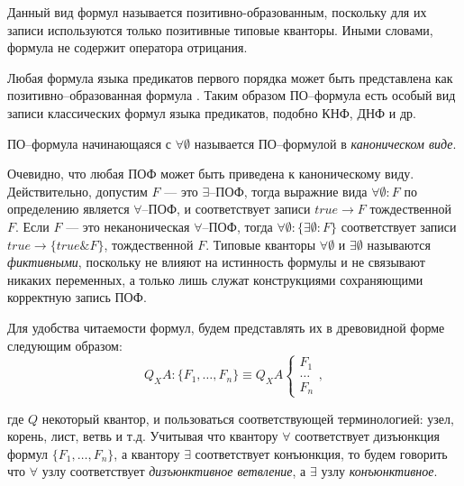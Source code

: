 Данный вид формул называется позитивно-образованным, поскольку для их записи используются только позитивные типовые кванторы. Иными словами, формула не содержит оператора отрицания.

Любая формула языка предикатов первого порядка может быть представлена как позитивно--образованная формула \cite{ICDS2000}. Таким образом ПО--формула есть особый вид записи классических формул языка предикатов, подобно КНФ, ДНФ и др.

ПО--формула начинающаяся с $\forall \emptyset$ называется ПО--формулой в {\em каноническом виде}.


Очевидно, что любая ПОФ может быть приведена к каноническому виду. Действительно, допустим $F$ --- это $\exists$--ПОФ, тогда выражние вида
$\forall \emptyset\colon F$ по определению является $\forall$--ПОФ, и соответствует записи $true \rightarrow F$ тождественной $F$. Если $F$ --- это неканоническая $\forall$--ПОФ, тогда $\forall \emptyset\colon\{\exists \emptyset\colon F\}$ соответствует записи $true \rightarrow \{true\&F\}$, тождественной $F$. Типовые кванторы $\forall \emptyset$ и $\exists \emptyset$ называются {\em фиктивными}, поскольку не влияют на истинность формулы и не связывают никаких переменных, а только лишь служат конструкциями сохраняющими корректную запись ПОФ.

Для удобства читаемости формул, будем представлять их в древовидной форме следующим образом:
$$Q_XA\colon\{F_1,\ldots,F_n\} \equiv Q_XA \left\{
\begin{array}{lcl}
 F_1 \\
 \ldots \\
 F_n
\end{array}
\right.,$$

\noindent{}где $Q$ некоторый квантор, и пользоваться соответствующей терминологией: узел, корень, лист, ветвь и т.д. Учитывая что квантору $\forall$ соответствует дизъюнкция формул $\{F_1,\ldots,F_n\}$, а квантору $\exists$ соответствует конъюнкция, то будем говорить что $\forall$ узлу соответствует {\em дизъюнктивное ветвление}, а $\exists$ узлу {\em конъюнктивное}.

